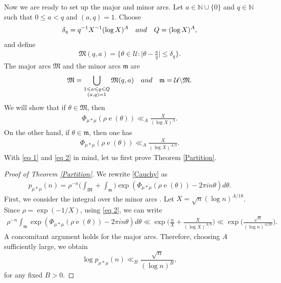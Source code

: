 \documentclass[11pt]{amsart}
\numberwithin{equation}{section}
\numberwithin{figure}{section}
\theoremstyle{definition}
\newcommand{\e}{\operatorname{e}}
\begin{document}
Now we are ready to set up the major and minor arcs. Let $a \in \mathbb{N}\cup \{0\}$ and $q \in \mathbb{N}$ such that $0 \leqslant a < q$ and $(a,q)=1$. Choose
\begin{align} \label{eq:def_delta_q}
    \delta_q = q^{-1}X^{-1}(\log X)^A \quad \textnormal{and} \quad Q = (\log X)^A,
\end{align} and define
\begin{align}
    \mathfrak{M}(q,a) = \bigg\{\theta \in \mathcal{U}: \bigg|\theta-\frac{a}{q}\bigg| \leqslant \delta_q \bigg\}.
\end{align}
The major arcs $\mathfrak{M}$ and the minor arcs $\mathfrak{m}$ are
\begin{align}\label{Major and Minor Arcs}
    \mathfrak{M} = \bigcup_{\substack{1 \leqslant a \leqslant q \leqslant Q \\ (a,q)=1}} \mathfrak{M}(q,a) \quad \textnormal{and} \quad \mathfrak{m} =  \mathcal{U} \backslash \mathfrak{M}.
\end{align}
We will show that if $\theta \in \mathfrak{M}$, then
\begin{align}\label{eq 1}
        \Phi_{\mu * \mu}(\rho \e (\theta)) \ll_A \frac{X}{(\log X)^{A}}.
\end{align}
On the other hand, if $\theta \in \mathfrak{m}$, then one has 
\begin{align}\label{eq 2}
        \Phi_{\mu * \mu}(\rho \e (\theta)) \ll_A \frac{X}{(\log X)^{A/9}}.
\end{align}  
With \eqref{eq 1} and \eqref{eq 2} in mind, let us first prove Theorem \ref{Partition}.

\begin{proof}[Proof of Theorem \textnormal{\ref{Partition}}] We rewrite \eqref{Cauchy} as
\begin{align}
    p_{\mu*\mu}(n) = \rho^{-n}\bigg(\int_{\mathfrak{M}}  + \int_{\mathfrak{m}}\bigg) \exp(\Phi_{\mu*\mu}(\rho \e (\theta))-2\pi i n \theta) d\theta.
\end{align}
First, we consider the integral over the minor arcs . Let $X = \sqrt{n} (\log n)^{A/18}$. Since $\rho =\exp(-1/X)$, using \eqref{eq 2}, we can write
\begin{align}
\rho^{-n} \int_{\mathfrak{m}} \exp(\Phi_{\mu*\mu}(\rho \e (\theta))-2\pi i n \theta) d\theta \ll \exp \bigg(\frac{n}{X}+\frac{X}{(\log X)^{A/9}} \bigg) \ll \exp \bigg(\frac{\sqrt{n}}{(\log n)^{A/20}} \bigg).
\end{align}
A concomitant argument holds for the major arcs. Therefore, choosing $A$ sufficiently large, we obtain
\[
\log p_{\mu*\mu}(n) \ll_B \frac{\sqrt{n}}{(\log n)^{B}},
\]
for any fixed $B>0$.
\end{proof}
\end{document}

